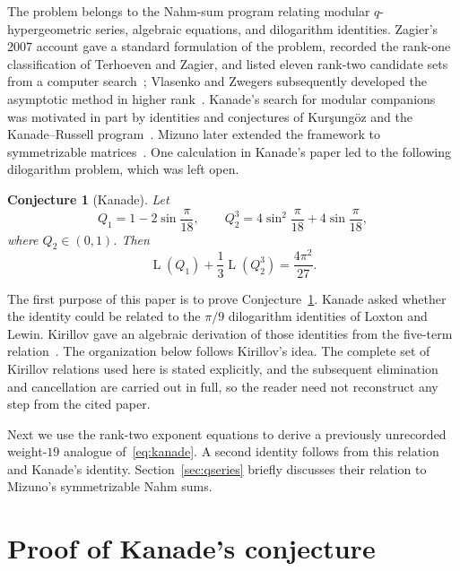 \documentclass[preprint,12pt,number]{elsarticle}
\newtheorem{conjecture}[theorem]{Conjecture}
\theoremstyle{remark}
\newcommand{\Lr}{\operatorname{L}}
\begin{document}
The problem belongs to the Nahm-sum program relating modular
$q$-hypergeometric series, algebraic equations, and dilogarithm identities.
Zagier's 2007 account gave a standard formulation of the problem, recorded
the rank-one classification of Terhoeven and Zagier, and listed eleven
rank-two candidate sets from a computer search~\cite{Zagier}; Vlasenko and
Zwegers subsequently
developed the asymptotic method in higher rank~\cite{VlasenkoZwegers}.
Kanade's search for modular companions was motivated in part by identities
and conjectures of Kur\c{s}ung\"oz and the Kanade--Russell
program~\cite{Kanade,Kursungoz}.  Mizuno later extended the framework to
symmetrizable matrices~\cite{Mizuno}.  One calculation in Kanade's paper led to the following dilogarithm problem, which was left open.

\begin{conjecture}[Kanade]\label{prop:kanadeconj}
Let
\begin{equation}\label{eq:Qdef}
Q_1=1-2\sin\frac{\pi}{18},\qquad
Q_2^3=4\sin^2\frac{\pi}{18}+4\sin\frac{\pi}{18},
\end{equation}
where $Q_2\in(0,1)$.  Then
\begin{equation}\label{eq:kanade}
\Lr(Q_1)+\frac13\Lr(Q_2^3)=\frac{4\pi^2}{27}.
\end{equation}
\end{conjecture}

The first purpose of this paper is to prove Conjecture~\ref{prop:kanadeconj}.
Kanade asked whether the identity could be related to the $\pi/9$
dilogarithm identities of Loxton and Lewin.  Kirillov gave an algebraic
derivation of those identities from the five-term relation~\cite[\S1.2.2]{Kirillov}.
The organization below follows Kirillov's idea.  The complete set of
Kirillov relations used here is stated explicitly, and the subsequent
elimination and cancellation are carried out in full, so the reader need
not reconstruct any step from the cited paper.

Next we use the rank-two exponent equations to derive a previously
unrecorded weight-$19$ analogue of~\eqref{eq:kanade}.  A second identity follows
from this relation and Kanade's identity.  Section~\ref{sec:qseries} briefly
discusses their relation to Mizuno's symmetrizable Nahm sums.

\section{Proof of Kanade's conjecture}
\end{document}
